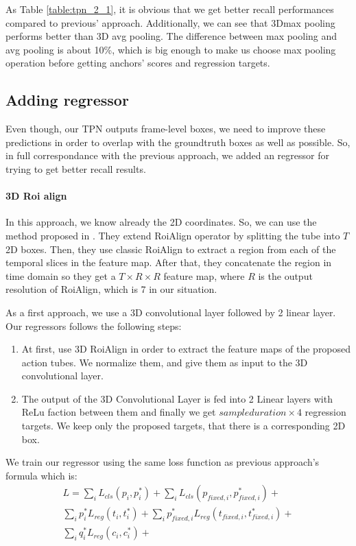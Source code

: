 \documentclass{report}
\begin{document}
As Table \ref{table:tpn_2_1}, it is obvious that we get better recall performances compared to previous' approach.
Additionally, we can see that 3Dmax pooling performs better than  3D avg pooling. The difference
between max pooling and avg pooling is about 10\%, which is big enough to make us choose max pooling operation before getting anchors' scores
and regression targets.

\subsection{Adding regressor}

Even though, our TPN outputs frame-level boxes, we need to improve these predictions in order to overlap
with the groundtruth boxes as well as possible.
So, in full correspondance with the previous approach, we added an regressor for trying to get better recall results.

\paragraph{3D Roi align}
In this approach, we know already the 2D coordinates. So, we can use the method proposed in \cite{DBLP:journals/corr/abs-1712-09184}. They
extend RoiAlign operator by splitting the tube into $T$ 2D boxes. Then, they use classic RoiAlign to extract a region from each
of the temporal slices in the feature map. After that, they concatenate the region in time domain so they get a $T \times R \times R$
feature map, where $R$ is the output resolution of RoiAlign, which is 7 in our situation. \par

As a first approach, we use a 3D convolutional layer followed by 2 linear layer. Our regressors follows the following steps:
\begin{enumerate}
\item At first, use 3D RoiAlign in order to extract the feature maps of the proposed action tubes. We normalize them, and give them as input to the 3D
  convolutional layer.
\item The output of the 3D Convolutional Layer is fed into 2 Linear layers with ReLu faction between them and finally we get $sample duration \times 4$
  regression targets. We keep only the proposed targets, that there is a corresponding 2D box.
\end{enumerate}


We train our regressor using the same loss function as previous approach's formula which is:
\begin{equation*} 
\begin{split}
 L  =  \sum_iL_{cls}(p_i, p_i^*) + \sum_iL_{cls}(p_{fixed,i}, p_{fixed,i}^*) + \\
 \sum_ip_i^*L_{reg}(t_i,t_i^*) + \sum_ip_{fixed,i}^*L_{reg}(t_{fixed,i},t_{fixed,i}^*) + \\
  \sum_iq_i^*L_{reg}(c_{i}, c_{i}^*) + \\
\end{split}
\end{equation*}
\end{document}
